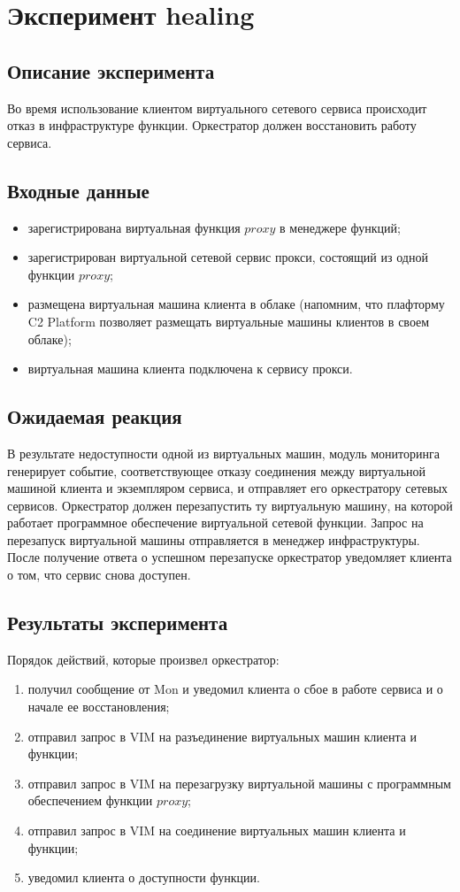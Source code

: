 \documentclass[oneside,final,14pt,a4paper]{extreport}
\begin{document}
\section{Эксперимент healing}
\subsection{Описание эксперимента}
Во время использование клиентом виртуального сетевого сервиса происходит отказ в инфраструктуре функции. Оркестратор должен восстановить работу сервиса.

\subsection{Входные данные}
\begin{itemize}
	\item зарегистрирована виртуальная функция $proxy$ в менеджере функций;
	\item зарегистрирован виртуальной сетевой сервис прокси, состоящий из одной функции $proxy$;
	\item размещена виртуальная машина клиента в облаке (напомним, что плафторму C2 Platform позволяет размещать виртуальные машины клиентов в своем облаке);
	\item виртуальная машина клиента подключена к сервису прокси.
\end{itemize}

\subsection{Ожидаемая реакция}
В результате недоступности одной из виртуальных машин, модуль мониторинга генерирует событие, соответствующее отказу соединения между виртуальной машиной клиента и экземпляром сервиса, и отправляет его оркестратору сетевых сервисов. Оркестратор должен перезапустить ту виртуальную машину, на которой работает программное обеспечение виртуальной сетевой функции. Запрос на перезапуск виртуальной машины отправляется в менеджер инфраструктуры. После получение ответа о успешном перезапуске оркестратор уведомляет клиента о том, что сервис снова доступен.

\subsection{Результаты эксперимента}
Порядок действий, которые произвел оркестратор:
\begin{enumerate}
	\item получил сообщение от Mon и уведомил клиента о сбое в работе сервиса и о начале ее восстановления;
	\item отправил запрос в VIM на разъединение виртуальных машин клиента и функции;
	\item отправил запрос в VIM на перезагрузку виртуальной машины с программным обеспечением функции $proxy$;
	\item отправил запрос в VIM на соединение виртуальных машин клиента и функции;
	\item уведомил клиента о доступности функции.
\end{enumerate}
\end{document}
